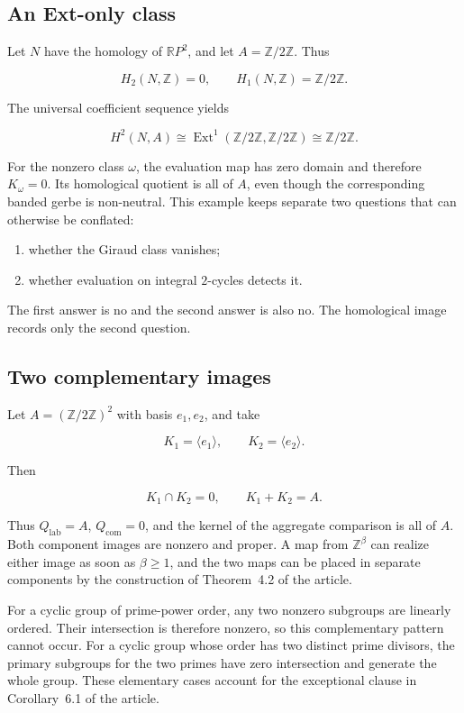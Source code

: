\subsection{An Ext-only class}

Let \(N\) have the homology of \(\mathbb RP^2\), and let
\(A=\mathbb Z/2\mathbb Z\).  Thus

\[
 H_2(N,\mathbb Z)=0,
 \qquad
 H_1(N,\mathbb Z)=\mathbb Z/2\mathbb Z.
\]

The universal coefficient sequence yields

\[
 H^2(N,A)
 \cong
 \operatorname{Ext}^1(\mathbb Z/2\mathbb Z,\mathbb Z/2\mathbb Z)
 \cong\mathbb Z/2\mathbb Z.
\]

For the nonzero class \(\omega\), the evaluation map has zero domain and
therefore \(K_\omega=0\).  Its homological quotient is all of \(A\), even
though the corresponding banded gerbe is non-neutral.  This example keeps
separate two questions that can otherwise be conflated:

\begin{enumerate}[label=(\alph*),nosep]
\item whether the Giraud class vanishes;
\item whether evaluation on integral \(2\)-cycles detects it.
\end{enumerate}

The first answer is no and the second answer is also no.  The homological
image records only the second question.

\subsection{Two complementary images}

Let \(A=(\mathbb Z/2\mathbb Z)^2\) with basis \(e_1,e_2\), and take

\[
 K_1=\langle e_1\rangle,
 \qquad
 K_2=\langle e_2\rangle.
\]

Then

\[
 K_1\cap K_2=0,
 \qquad
 K_1+K_2=A.
\]

Thus \(Q_{\mathrm{lab}}=A\), \(Q_{\mathrm{com}}=0\), and the kernel of the
aggregate comparison is all of \(A\).  Both component images are nonzero
and proper.  A map from \(\mathbb Z^\beta\) can realize either image as soon
as \(\beta\ge1\), and the two maps can be placed in separate components by
the construction of Theorem~4.2 of the article.

For a cyclic group of prime-power order, any two nonzero subgroups are
linearly ordered.  Their intersection is therefore nonzero, so this
complementary pattern cannot occur.  For a cyclic group whose order has two
distinct prime divisors, the primary subgroups for the two primes have zero
intersection and generate the whole group.  These elementary cases account
for the exceptional clause in Corollary~6.1 of the article.

